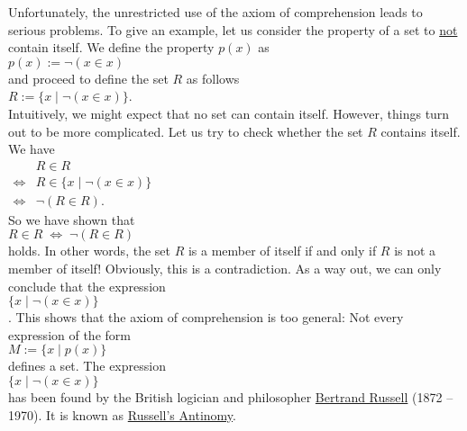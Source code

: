 Unfortunately, the unrestricted use of the axiom of comprehension leads to serious problems.  To give an
example, let us consider the property of a set to \underline{not} contain itself.  We define the property
$p(x)$ as
\\[0.2cm]
\hspace*{1.3cm}
 $p(x) := \neg(x \in x)$ 
\\[0.2cm]
and proceed to define the set $R$ as follows
\\[0.2cm]
\hspace*{1.3cm} 
$R := \{ x \;|\; \neg (x \in x) \}$.  
\\[0.2cm]
Intuitively, we might expect that no set can contain itself.  However, things turn out to be more complicated.
Let us try to check whether the set $R$ contains itself.  We have
\\[0.2cm]
\hspace*{1.3cm}
$
\begin{array}{cl}
                  & R \in R \\[0.2cm] 
  \Leftrightarrow & R \in \bigl\{ x \;|\; \neg (x \in x) \bigr\} \\[0.2cm] 
  \Leftrightarrow & \neg (R \in R).
\end{array}
$
\\[0.2cm]
So we have shown that
\\[0.2cm]
\hspace*{1.3cm}
$R \in R \;\Leftrightarrow\; \neg(R \in R)$
\\[0.2cm]
holds.  In other words, the set $R$ is a member of itself if and only if $R$ is not a member of itself!
Obviously, this is a contradiction.  As a way out, we can only conclude that the expression \\[0.2cm]
\hspace*{1.3cm} $\{ x \mid \neg (x \in x) \}$ \\[0.2cm]
.  This shows that the axiom of comprehension is too general:  Not every expression of the form 
\\[0.2cm] 
\hspace*{1.3cm}
$M := \{ x \mid p(x) \}$ 
\\[0.2cm]
defines a set.  The expression
\\[0.2cm]
\hspace*{1.3cm}
$\bigl\{x \mid \neg(x \in x)\bigr\}$
\\[0.2cm]
has been found by the British logician and philosopher 
\href{http://de.wikipedia.org/wiki/Bertrand_Russell}{Bertrand Russell} (1872 -- 1970).  It is known as
\href{http://de.wikipedia.org/wiki/Russellsche_Antinomy}{Russell's Antinomy}. 

